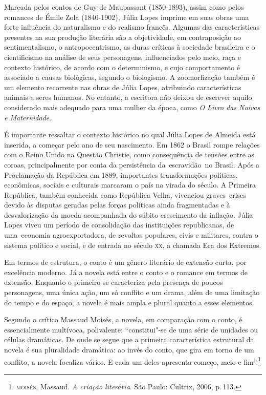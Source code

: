 Marcada pelos contos de Guy de Maupassant (1850-1893), assim como pelos
romances de Émile Zola (1840-1902), Júlia Lopes imprime em suas obras
uma forte influência do naturalismo e do realismo francês. Algumas das
características presentes na sua produção literária são a objetividade,
em contraposição ao sentimentalismo, o antropocentrismo, as duras
críticas à sociedade brasileira e o cientificismo na análise de seus
personagens, influenciados pelo meio, raça e contexto histórico, de
acordo com o determinismo, e cujo comportamento é associado a causas
biológicas, segundo o biologismo. A zoomorfização também é um elemento
recorrente nas obras de Júlia Lopes, atribuindo características animais
a seres humanos. No entanto, a escritora não deixou de escrever aquilo
considerado mais adequado para uma mulher da época, como \emph{O Livro
das Noivas e Maternidade}.

É importante ressaltar o contexto histórico no qual Júlia Lopes de
Almeida está inserida, a começar pelo ano de seu nascimento. Em 1862 o
Brasil rompe relações com o Reino Unido na Questão Christie, como
consequência de tensões entre as coroas, principalmente por conta da
persistência da~escravidão~no Brasil. Após a Proclamação da República em
1889, importantes transformações políticas, econômicas, sociais e
culturais marcaram o país na virada do século. A Primeira República,
também conhecida como República Velha, vivenciou graves~crises devido às
disputas geradas pelas forças políticas ainda fragmentadas e à
desvalorização da moeda acompanhada do súbito crescimento da inflação.
Júlia Lopes viveu um período de consolidação das instituições
republicanas, de uma~economia agroexportadora, de revoltas populares,
civis e militares, contra o sistema político e social, e de entrada no
século \textsc{xx}, a chamada Era dos Extremos.

Em termos de estrutura, o conto é um gênero literário de extensão curta, por excelência moderno. Já a novela está entre o conto e o
romance em termos de extensão. Enquanto o primeiro se caracteriza pela
presença de poucos personagens, uma única ação, um só conflito e um
drama, além de uma limitação do tempo e do espaço, a novela é mais ampla
e plural quanto a esses elementos.

Segundo o crítico Massaud Moisés, a novela, em comparação com o conto, é essencialmente multívoca, polivalente: ``constitui"-se de uma série de unidades ou células dramáticas. De onde se segue que a primeira característica estrutural da novela é sua pluralidade dramática: ao invés do conto, que gira em torno de um conflito, a novela focaliza vários. E cada um deles apresenta começo, meio e fim''.\footnote{\textsc{moisés}, Massaud. \textit{A criação literária}. São Paulo: Cultrix, 2006, p.\,113.}

